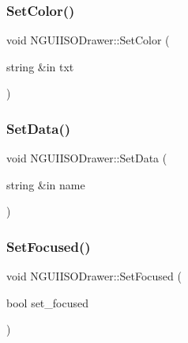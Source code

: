\hypertarget{class_n_g_u_i_i_s_o_drawer_a19962bf6f4a1971d93914152a202847f}{}\label{class_n_g_u_i_i_s_o_drawer_a19962bf6f4a1971d93914152a202847f} 
\subsubsection{\texorpdfstring{Set\+Color()}{SetColor()}\hspace{0.1cm}{\footnotesize\ttfamily [2/2]}}
{\footnotesize\ttfamily void N\+G\+U\+I\+I\+S\+O\+Drawer\+::\+Set\+Color (\begin{DoxyParamCaption}\item[{string \&in}]{txt }\end{DoxyParamCaption})}

\hypertarget{class_n_g_u_i_i_s_o_drawer_a2e8d8abf2cb0b2b0d86669f8a3547cf7}{}\label{class_n_g_u_i_i_s_o_drawer_a2e8d8abf2cb0b2b0d86669f8a3547cf7} 
\subsubsection{\texorpdfstring{Set\+Data()}{SetData()}}
{\footnotesize\ttfamily void N\+G\+U\+I\+I\+S\+O\+Drawer\+::\+Set\+Data (\begin{DoxyParamCaption}\item[{string \&in}]{name }\end{DoxyParamCaption})}

\hypertarget{class_n_g_u_i_i_s_o_drawer_a253e76b08f3e92b68a0afba6f189e9fc}{}\label{class_n_g_u_i_i_s_o_drawer_a253e76b08f3e92b68a0afba6f189e9fc} 
\subsubsection{\texorpdfstring{Set\+Focused()}{SetFocused()}}
{\footnotesize\ttfamily void N\+G\+U\+I\+I\+S\+O\+Drawer\+::\+Set\+Focused (\begin{DoxyParamCaption}\item[{bool}]{set\+\_\+focused }\end{DoxyParamCaption})}

